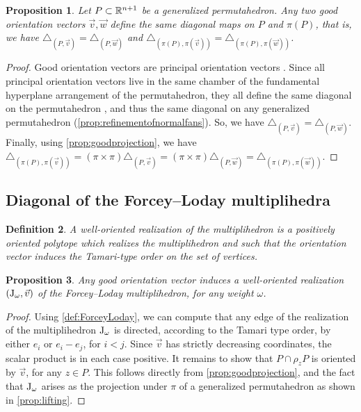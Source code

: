 \documentclass[10pt]{amsart}
\newtheorem{definition}{Definition}[section]
\newtheorem{proposition}[definition]{Proposition}
\theoremstyle{remark}
\begin{document}
\begin{proposition}
Let $P\subset\mathbb{R}^{n+1}$ be a generalized permutahedron. 
Any two good orientation vectors $\vec v, \vec w$ define the same diagonal maps on $P$ and $\pi(P)$, that is, we have $\triangle_{(P,\vec v)}=\triangle_{(P,\vec w)}$ and $\triangle_{(\pi(P),\pi(\vec v))}=\triangle_{(\pi(P),\pi(\vec w))}$.
\end{proposition}
\begin{proof}
Good orientation vectors are principal orientation vectors \cite[Definition 3.15]{LA21}. Since all principal orientation vectors live in the same chamber of the fundamental hyperplane arrangement of the permutahedron, they all define the same diagonal on the permutahedron \cite[Proposition 1.23]{LA21}, and thus the same diagonal on any generalized permutahedron (\cref{prop:refinementofnormalfans}). So, we have $\triangle_{(P,\vec v)}=\triangle_{(P,\vec w)}$. Finally, using \cref{prop:goodprojection}, we have $\triangle_{(\pi(P),\pi(\vec v))}=(\pi \times \pi)\triangle_{(P,\vec v)}=(\pi \times \pi)\triangle_{(P,\vec w)}=\triangle_{(\pi(P),\pi(\vec w))}$. 
\end{proof}

\subsection{Diagonal of the Forcey--Loday multiplihedra}
\label{sec:diagonal}

\begin{definition}
A \emph{well-oriented realization of the multiplihedron} is a positively oriented polytope which realizes the multiplihedron and such that the orientation vector induces the Tamari-type order on the set of vertices. 
\end{definition}

\begin{proposition}
\label{prop:OrientationVector}
Any good orientation vector induces a well-oriented realization $\left( \mathrm{J}_\omega, \vec v \right)$ of the Forcey--Loday multiplihedron, for any weight $\omega$. 
\end{proposition}

\begin{proof}
Using \cref{def:ForceyLoday}, we can compute that any edge of the realization of the multiplihedron $\mathrm{J}_\omega$ is directed, according to the Tamari type order, by either $ e_i$ or $ e_i- e_j$, for $i<j$.
Since $\vec v$ has strictly decreasing coordinates, the scalar product is in each case positive. 
It remains to show that $P\cap\rho_z P$ is oriented by $\vec v$, for any $z \in P$. 
This follows directly from \cref{prop:goodprojection}, and the fact that $\mathrm{J}_\omega$ arises as the projection under $\pi$ of a generalized permutahedron as shown in  \cref{prop:lifting}.
\end{proof}
\end{document}

